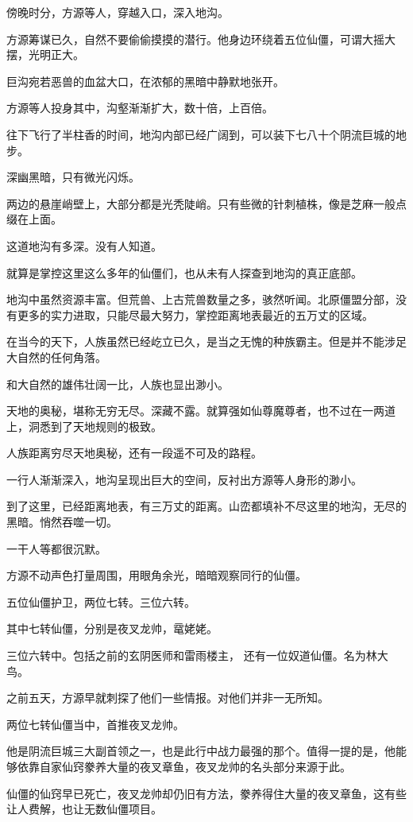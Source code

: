 \begin{this_body}
傍晚时分，方源等人，穿越入口，深入地沟。

方源筹谋已久，自然不要偷偷摸摸的潜行。他身边环绕着五位仙僵，可谓大摇大摆，光明正大。

巨沟宛若恶兽的血盆大口，在浓郁的黑暗中静默地张开。

方源等人投身其中，沟壑渐渐扩大，数十倍，上百倍。

往下飞行了半柱香的时间，地沟内部已经广阔到，可以装下七八十个阴流巨城的地步。

深幽黑暗，只有微光闪烁。

两边的悬崖峭壁上，大部分都是光秃陡峭。只有些微的针刺植株，像是芝麻一般点缀在上面。

这道地沟有多深。没有人知道。

就算是掌控这里这么多年的仙僵们，也从未有人探查到地沟的真正底部。

地沟中虽然资源丰富。但荒兽、上古荒兽数量之多，骇然听闻。北原僵盟分部，没有更多的实力进取，只能尽最大努力，掌控距离地表最近的五万丈的区域。

在当今的天下，人族虽然已经屹立已久，是当之无愧的种族霸主。但是并不能涉足大自然的任何角落。

和大自然的雄伟壮阔一比，人族也显出渺小。

天地的奥秘，堪称无穷无尽。深藏不露。就算强如仙尊魔尊者，也不过在一两道上，洞悉到了天地规则的极致。

人族距离穷尽天地奥秘，还有一段遥不可及的路程。

一行人渐渐深入，地沟呈现出巨大的空间，反衬出方源等人身形的渺小。

到了这里，已经距离地表，有三万丈的距离。山峦都填补不尽这里的地沟，无尽的黑暗。悄然吞噬一切。

一干人等都很沉默。

方源不动声色打量周围，用眼角余光，暗暗观察同行的仙僵。

五位仙僵护卫，两位七转。三位六转。

其中七转仙僵，分别是夜叉龙帅，鼋姥姥。

三位六转中。包括之前的玄阴医师和雷雨楼主， 还有一位奴道仙僵。名为林大鸟。

之前五天，方源早就刺探了他们一些情报。对他们并非一无所知。

两位七转仙僵当中，首推夜叉龙帅。

他是阴流巨城三大副首领之一，也是此行中战力最强的那个。值得一提的是，他能够依靠自家仙窍豢养大量的夜叉章鱼，夜叉龙帅的名头部分来源于此。

仙僵的仙窍早已死亡，夜叉龙帅却仍旧有方法，豢养得住大量的夜叉章鱼，这有些让人费解，也让无数仙僵项目。


\end{this_body}
